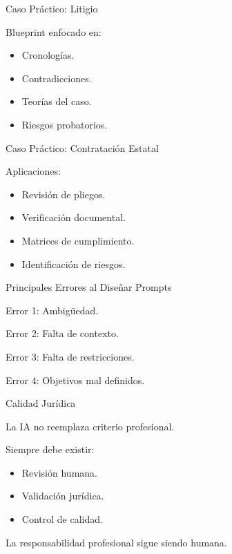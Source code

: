 \documentclass[aspectratio=169]{beamer}
\begin{document}
\begin{frame}{Caso Práctico: Litigio}


Blueprint enfocado en:

\begin{itemize}
  \item Cronologías.
  \item Contradicciones.
  \item Teorías del caso.
  \item Riesgos probatorios.
\end{itemize}
\end{frame}

\begin{frame}{Caso Práctico: Contratación Estatal}


Aplicaciones:

\begin{itemize}
  \item Revisión de pliegos.
  \item Verificación documental.
  \item Matrices de cumplimiento.
  \item Identificación de riesgos.
\end{itemize}
\end{frame}

\begin{frame}{Principales Errores al Diseñar Prompts}


Error 1: Ambigüedad.

Error 2: Falta de contexto.

Error 3: Falta de restricciones.

Error 4: Objetivos mal definidos.

\end{frame}

\begin{frame}{Calidad Jurídica}


La IA no reemplaza criterio profesional.

Siempre debe existir:

\begin{itemize}
  \item Revisión humana.
  \item Validación jurídica.
  \item Control de calidad.
\end{itemize}
La responsabilidad profesional sigue siendo humana.

\end{frame}
\end{document}
